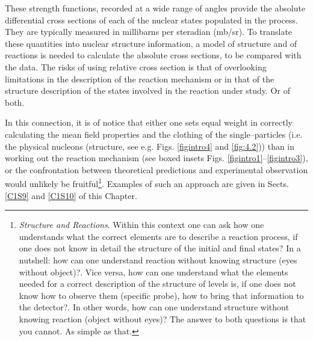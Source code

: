 These strength functions, recorded at a wide range of angles provide the absolute differential cross sections of each of the nuclear states populated in the process. They are  typically measured in millibarns per  steradian (mb/sr). To translate these quantities into nuclear structure information, a model of structure and of reactions is needed to calculate the absolute cross sections, to be compared with the data. The risks of using relative cross section is that of overlooking limitations in the description of the reaction mechanism or in that of the structure description of the states involved in the reaction under study. Or of both.

In this connection, it is of notice that either one sets equal weight in correctly calculating the mean field properties and the clothing of the single--particles (i.e. the physical nucleons (structure, see e.g. Figs. \ref{figintro4} and \ref{fig:4.2})) than in working out the reaction mechanism (see boxed insets Figs. \ref{figintro1}--\ref{figintro3}), or the confrontation between theoretical predictions and experimental observation would unlikely be fruitful\footnote{\textit{Structure and Reactions}. Within this context one can ask how one understands what the correct elements are to describe a reaction process, if one does not know in detail the structure of the initial and final states? In a nutshell: how can one understand reaction without knowing structure (eyes without object)?. 
Vice versa, how can one understand what the elements needed for a correct description of the structure of levels is, if one does not know how to observe them (specific probe), how to bring that information to the detector?. In other words, how can one understand structure without knowing reaction (object without eyes)? The answer to both questions is that you cannot. As simple as that.}. Examples of such an approach are given in Sects. \ref{C1S9} and \ref{C1S10} of this Chapter.


